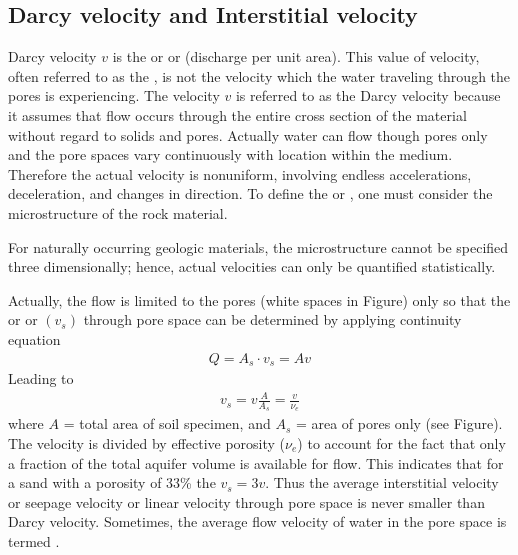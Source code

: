 \documentclass[letterpaper,10pt,english]{sphinxmanual}
\let\sphinxpxdimen\pdfpxdimen\else\newdimen\sphinxpxdimen
\begin{document}
\subsection{Darcy velocity and Interstitial velocity}
\label{\detokenize{contents/flow/lecture_04/14_darcy_law_K:darcy-velocity-and-interstitial-velocity}}
Darcy velocity \(v\) is the  or  or  (discharge per
unit area). This value of velocity, often referred to as the , is not the
velocity which the water traveling through the pores is experiencing. The velocity \(v\) is
referred to as the Darcy velocity because it assumes that flow occurs through the entire cross section of the material without regard to solids and pores. Actually water can flow
though pores only and the pore spaces vary continuously with location within the
medium. Therefore the actual velocity is nonuniform, involving endless accelerations,
deceleration, and changes in direction. To define the  or , one must consider the microstructure of the rock material.

For naturally occurring geologic materials, the microstructure cannot be specified three\sphinxhyphen{}
dimensionally; hence, actual velocities can only be quantified statistically.

\noindent\sphinxincludegraphics[width=300\sphinxpxdimen]{{L4_f8}.png}

Actually, the flow is limited to the pores (white spaces in Figure) only so that the
 or  or  \((v_s)\) through pore space
can be determined by applying continuity equation
\begin{equation*}
\begin{split}
Q = A_s\cdot v_s = Av
\end{split}
\end{equation*}
Leading to
\begin{equation*}
\begin{split}
v_s = v\frac{A}{A_s} = \frac{v}{\nu_e}
\end{split}
\end{equation*}
where \(A\) = total area of soil specimen, and \(A_s\) = area of pores only (see Figure). The velocity
is divided by effective porosity (\(\nu_e\)) to account for the fact that only a fraction of the total aquifer
volume is available for flow. This indicates that for a sand with a porosity of 33\% the \(v_s
= 3 v\). Thus the average interstitial velocity or seepage velocity or linear velocity through
pore space is never smaller than Darcy velocity. Sometimes, the average flow velocity of
water in the pore space is termed .
\end{document}
